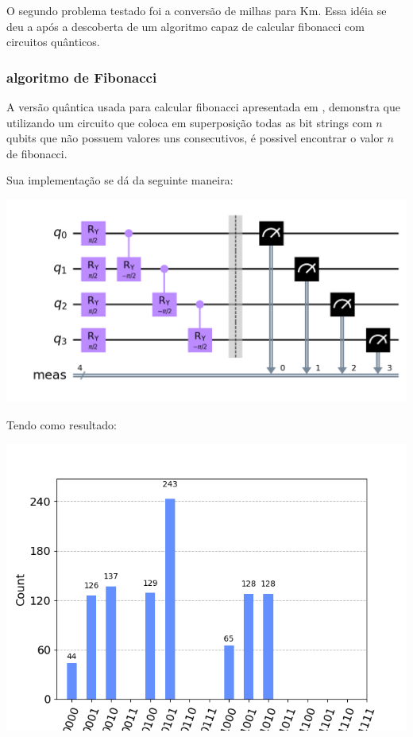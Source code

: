 \documentclass{article}
\begin{document}
O segundo problema testado foi a conversão de milhas para Km. Essa idéia se deu a após a descoberta de um algoritmo capaz de calcular fibonacci com circuitos quânticos.

\subsubsection{algoritmo de Fibonacci}

A versão quântica usada para calcular fibonacci apresentada em \cite{gilliam2020canonical}, demonstra que utilizando um circuito que coloca em superposição todas as bit strings com $n$ qubits que não possuem valores uns consecutivos, é possivel encontrar o valor $n$ de fibonacci.

Sua implementação se dá da seguinte maneira:

\begin{center}
	\includegraphics[scale=0.3]{fibonacci-circuit.png}
	\label{fig:fibonacci-circuit}
\end{center}

Tendo como resultado:

\begin{center}
	\includegraphics[scale=0.5]{fibonacci-4.png}
	\label{fig:fibonacci-circuit-result}
\end{center}
\end{document}
